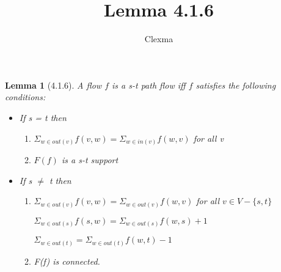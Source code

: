 \documentclass{article}
\title{Lemma 4.1.6}
\author{Clexma}
\newtheorem{lemma}{Lemma}
\begin{document}
\maketitle
\begin{lemma}[4.1.6] A flow $f$ is a \textit{s-t} path flow iff $f$ satisfies the following conditions:
\begin{itemize}
\item If s = t then
\begin{enumerate}
\item $\Sigma_{w\in out(v)} f(v,w) = \Sigma_{w\in in(v)} f(w,v)$ for all v
\item $F(f)$ is a s-t support


\end{enumerate}


\item If s $\ne$ t then
\begin{enumerate}
\item $\Sigma_{w\in out(v)} f(v,w) = \Sigma_{w\in out(v)} f(w,v)$ for all $v\in V-\{s,t\}$

$\Sigma_{w\in out(s)} f(s,w) = \Sigma_{w\in out(s)} f(w,s) + 1$

$\Sigma_{w\in out(t)} = \Sigma_{w\in out(t)} f(w,t) - 1$


\item F(f) is connected.
\end{enumerate}

\end{itemize}



\end{lemma}
\end{document}

